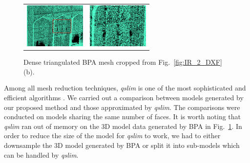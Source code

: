 \documentclass[10pt,twocolumn,letterpaper]{article}
\newcommand{\Fig}[1]{Fig.~\ref{fig:#1}}
\newcommand{\Figb}[1]{Fig.~\ref{fig:#1}(b)}
\begin{document}
\begin{figure}[htbp]
\begin{center} 
\begin{tabular}{cc}
\includegraphics[width=1.2in]{BPA_TH.png} &
\includegraphics[width=1.2in]{BPA_TH_1.png}
\end{tabular}
\end{center}
\caption{Dense triangulated BPA mesh cropped from \Figb{IR_2_DXF}.}
\label{fig:TH_BPA}
\end{figure}

Among all mesh reduction techniques, {\it qslim} is one of the most
sophisticated and efficient algorithms \cite{BPA_GH}.
We carried out a comparison between models generated by our proposed
method and those approximated by {\it qslim}.
The comparisons were conducted on models sharing the same number of faces.
It is worth noting that {\it qslim} ran out of memory on the 3D model data
generated by BPA in \Fig{TH_BPA}.
In order to reduce the size of the model for {\it qslim} to work, we had
to either downsample the 3D model generated by BPA or split it into
sub-models which can be handled by {\it qslim}.
\end{document}
